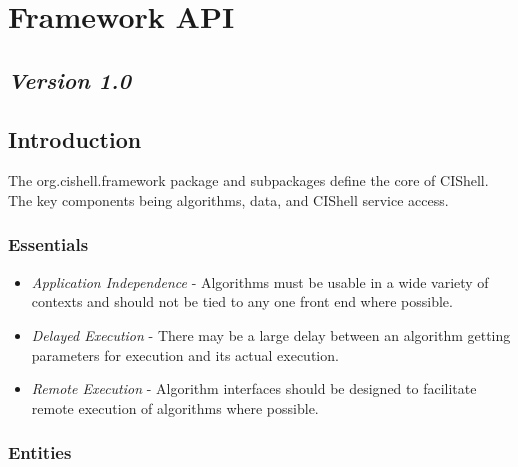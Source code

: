 \chapter{Framework API}

\section*{\textit{Version 1.0}}

\section{Introduction}

The org.cishell.framework package and subpackages define the core of CIShell. The
key components being algorithms, data, and CIShell service access.

\subsection{Essentials}

\begin{itemize}
  \item \textit{Application Independence} - Algorithms must be usable in a wide
  variety of contexts and should not be tied to any one front end where
  possible.
  \item \textit{Delayed Execution} - There may be a large delay between an
  algorithm getting parameters for execution and its actual execution.
  \item \textit{Remote Execution} - Algorithm interfaces should be designed to
  facilitate remote execution of algorithms where possible.
\end{itemize}

\subsection{Entities}

